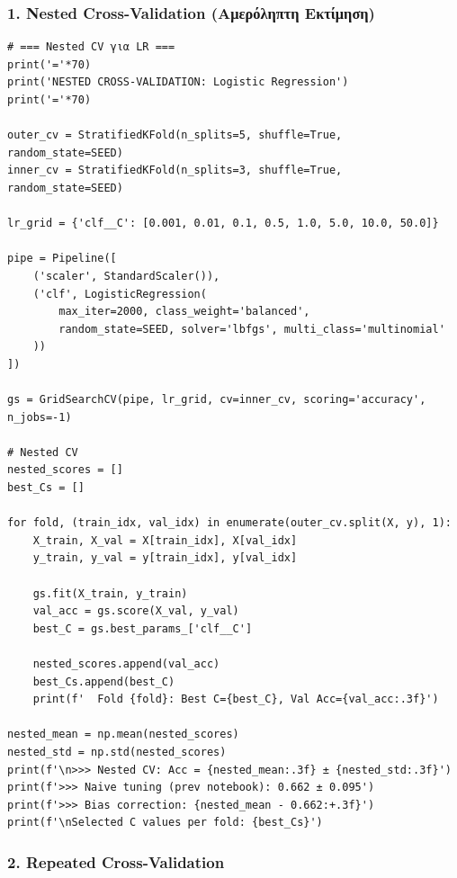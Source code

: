 \subsubsection*{1. Nested Cross-Validation (Αμερόληπτη Εκτίμηση)}
 
\begin{lstlisting}
# === Nested CV για LR ===
print('='*70)
print('NESTED CROSS-VALIDATION: Logistic Regression')
print('='*70)
 
outer_cv = StratifiedKFold(n_splits=5, shuffle=True, random_state=SEED)
inner_cv = StratifiedKFold(n_splits=3, shuffle=True, random_state=SEED)
 
lr_grid = {'clf__C': [0.001, 0.01, 0.1, 0.5, 1.0, 5.0, 10.0, 50.0]}
 
pipe = Pipeline([
    ('scaler', StandardScaler()),
    ('clf', LogisticRegression(
        max_iter=2000, class_weight='balanced',
        random_state=SEED, solver='lbfgs', multi_class='multinomial'
    ))
])
 
gs = GridSearchCV(pipe, lr_grid, cv=inner_cv, scoring='accuracy', n_jobs=-1)
 
# Nested CV
nested_scores = []
best_Cs = []
 
for fold, (train_idx, val_idx) in enumerate(outer_cv.split(X, y), 1):
    X_train, X_val = X[train_idx], X[val_idx]
    y_train, y_val = y[train_idx], y[val_idx]
 
    gs.fit(X_train, y_train)
    val_acc = gs.score(X_val, y_val)
    best_C = gs.best_params_['clf__C']
 
    nested_scores.append(val_acc)
    best_Cs.append(best_C)
    print(f'  Fold {fold}: Best C={best_C}, Val Acc={val_acc:.3f}')
 
nested_mean = np.mean(nested_scores)
nested_std = np.std(nested_scores)
print(f'\n>>> Nested CV: Acc = {nested_mean:.3f} ± {nested_std:.3f}')
print(f'>>> Naive tuning (prev notebook): 0.662 ± 0.095')
print(f'>>> Bias correction: {nested_mean - 0.662:+.3f}')
print(f'\nSelected C values per fold: {best_Cs}')
\end{lstlisting}
 
\subsubsection*{2. Repeated Cross-Validation}
 
